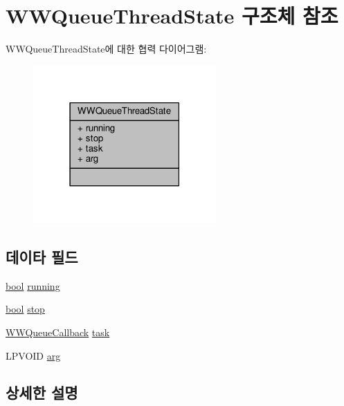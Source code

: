 \hypertarget{struct_w_w_queue_thread_state}{}\section{W\+W\+Queue\+Thread\+State 구조체 참조}
\label{struct_w_w_queue_thread_state}


W\+W\+Queue\+Thread\+State에 대한 협력 다이어그램\+:
\nopagebreak
\begin{figure}[H]
\begin{center}
\leavevmode
\includegraphics[width=198pt]{struct_w_w_queue_thread_state__coll__graph}
\end{center}
\end{figure}
\subsection*{데이타 필드}
\begin{DoxyCompactItemize}
\item 
\hyperlink{avb__gptp_8h_af6a258d8f3ee5206d682d799316314b1}{bool} \hyperlink{struct_w_w_queue_thread_state_a36f7b6be7108281af77939ceaec42fd6}{running}
\item 
\hyperlink{avb__gptp_8h_af6a258d8f3ee5206d682d799316314b1}{bool} \hyperlink{struct_w_w_queue_thread_state_a53a2d16dac430353052f49aaa0cce34a}{stop}
\item 
\hyperlink{work__queue_8hpp_af69b92fbf5afe098f578d0cce8298f84}{W\+W\+Queue\+Callback} \hyperlink{struct_w_w_queue_thread_state_a1252d1bbdec76fb559cd091bd145ed91}{task}
\item 
L\+P\+V\+O\+ID \hyperlink{struct_w_w_queue_thread_state_ad688f8fe19987dce997535b44605a118}{arg}
\end{DoxyCompactItemize}


\subsection{상세한 설명}


